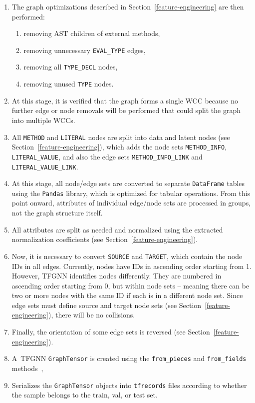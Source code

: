 \begin{enumerate}
    \item The graph optimizations described in Section~\ref{feature-engineering} are then performed:
    \begin{enumerate}
        \item removing AST children of external methods,
        \item removing unnecessary \texttt{EVAL\_TYPE} edges,
        \item removing all \texttt{TYPE\_DECL} nodes,
        \item removing unused \texttt{TYPE} nodes.
    \end{enumerate}
    \item At this stage, it is verified that the graph forms a single WCC because no further edge or node removals will be performed that could split the graph into multiple WCCs.
    \item All \texttt{METHOD} and \texttt{LITERAL} nodes are split into data and latent nodes (see Section~\ref{feature-engineering}), which adds the node sets \texttt{METHOD\_INFO}, \texttt{LITERAL\_VALUE}, and also the edge sets \texttt{METHOD\_INFO\_LINK} and \texttt{LITERAL\_VALUE\_LINK}.
    \item At this stage, all node/edge sets are converted to separate \texttt{DataFrame} tables using the \texttt{Pandas} library, which is optimized for tabular operations. From this point onward, attributes of individual edge/node sets are processed in groups, not the graph structure itself.
    \item All attributes are split as needed and normalized using the extracted normalization coefficients (see Section~\ref{feature-engineering}).
    \item Now, it is necessary to convert \texttt{SOURCE} and \texttt{TARGET}, which contain the node IDs in all edges. Currently, nodes have IDs in ascending order starting from 1. However, TFGNN identifies nodes differently. They are numbered in ascending order starting from 0, but within node sets -- meaning there can be two or more nodes with the same ID if each is in a different node set. Since edge sets must define source and target node sets (see Section~\ref{feature-engineering}), there will be no collisions.
    \item Finally, the orientation of some edge sets is reversed (see Section~\ref{feature-engineering}).
    \item A~TFGNN \texttt{GraphTensor} is created using the \texttt{from\_pieces} and \texttt{from\_fields} methods~\cite{tfgnn-graphtensor},
    \item Serializes the \texttt{GraphTensor} objects into \texttt{tfrecords} files according to whether the sample belongs to the train, val, or test set.
\end{enumerate}

